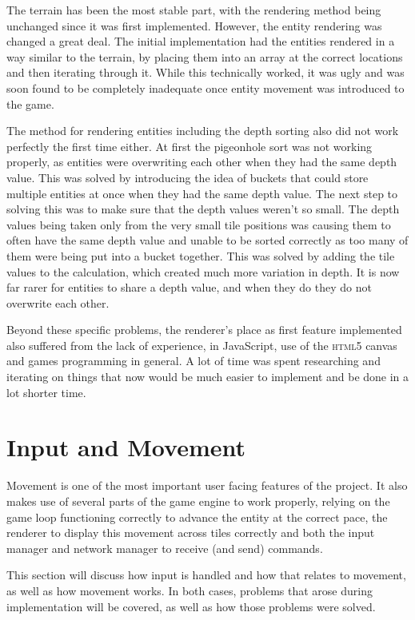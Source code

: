The terrain has been the most stable part, with the rendering method being unchanged since it was first implemented. However, the entity rendering was changed a great deal. The initial implementation had the entities rendered in a way similar to the terrain, by placing them into an array at the correct locations and then iterating through it. While this technically worked, it was ugly and was soon found to be completely inadequate once entity movement was introduced to the game.

The method for rendering entities including the depth sorting also did not work perfectly the first time either. At first the pigeonhole sort was not working properly, as entities were overwriting each other when they had the same depth value. This was solved by introducing the idea of buckets that could store multiple entities at once when they had the same depth value. The next step to solving this was to make sure that the depth values weren't so small. The depth values being taken only from the very small tile positions was causing them to often have the same depth value and unable to be sorted correctly as too many of them were being put into a bucket together. This was solved by adding the tile values to the calculation, which created much more variation in depth. It is now far rarer for entities to share a depth value, and when they do they do not overwrite each other.

Beyond these specific problems, the renderer's place as first feature implemented also suffered from the lack of experience, in JavaScript, use of the \textsc{html5} canvas and games programming in general. A lot of time was spent researching and iterating on things that now would be much easier to implement and be done in a lot shorter time.

\section{Input and Movement}
Movement is one of the most important user facing features of the project. It also makes use of several parts of the game engine to work properly, relying on the game loop functioning correctly to advance the entity at the correct pace, the renderer to display this movement across tiles correctly and both the input manager and network manager to receive (and send) commands.

This section will discuss how input is handled and how that relates to movement, as well as how movement works. In both cases, problems that arose during implementation will be covered, as well as how those problems were solved.

